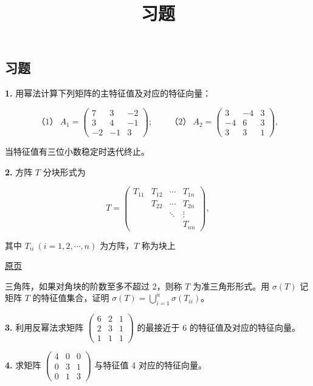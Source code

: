 \documentclass[
  10pt,
  fontset=fandol]{ctexart}
\title{习题}
\author{}
\date{}
\begin{document}
\maketitle

\subsection{习题}\label{ux4e60ux9898}

\textbf{1.} 用幂法计算下列矩阵的主特征值及对应的特征向量：

\[
\text{（1）}\ A_1=\begin{pmatrix}7&3&-2\\3&4&-1\\-2&-1&3\end{pmatrix};\qquad
\text{（2）}\ A_2=\begin{pmatrix}3&-4&3\\-4&6&3\\3&3&1\end{pmatrix},
\]

当特征值有三位小数稳定时迭代终止。

\textbf{2.} 方阵 \(T\) 分块形式为

\[
T=\begin{pmatrix}
T_{11}&T_{12}&\cdots&T_{1n}\\
&T_{22}&\cdots&T_{2n}\\
&&\ddots&\vdots\\
&&&T_{nn}
\end{pmatrix},
\]

其中 \(T_{ii}\ (i=1,2,\cdots,n)\) 为方阵，\(T\) 称为块上

\href{../../source-images/pdf-260.jpeg}{原页}

三角阵，如果对角块的阶数至多不超过 2，则称 \(T\) 为准三角形形式。用 \(\sigma(T)\) 记矩阵 \(T\) 的特征值集合，证明 \(\sigma(T)=\displaystyle\bigcup_{i=1}^{n}\sigma(T_{ii})\)。

\textbf{3.} 利用反幂法求矩阵 \(\begin{pmatrix}6&2&1\\2&3&1\\1&1&1\end{pmatrix}\) 的最接近于 6 的特征值及对应的特征向量。

\textbf{4.} 求矩阵 \(\begin{pmatrix}4&0&0\\0&3&1\\0&1&3\end{pmatrix}\) 与特征值 4 对应的特征向量。
\end{document}

